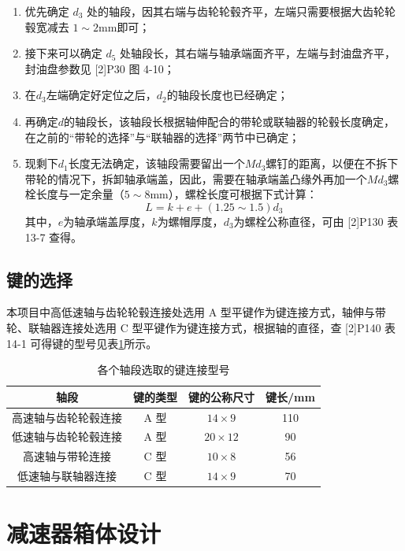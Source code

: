 \documentclass[12pt]{ctexart}
\begin{document}
\begin{enumerate}
    \item 优先确定 $d_3$ 处的轴段，因其右端与齿轮轮毂齐平，左端只需要根据大齿轮轮毂宽减去 $1\sim 2\text{mm}$即可；
    \item 接下来可以确定 $d_5$ 处轴段长，其右端与轴承端面齐平，左端与封油盘齐平，封油盘参数见 [2]P30 图 4-10；
    \item 在$d_3$左端确定好定位之后，$d_2$的轴段长度也已经确定；
    \item 再确定$d$的轴段长，该轴段长根据轴伸配合的带轮或联轴器的轮毂长度确定，在之前的“带轮的选择”与“联轴器的选择”两节中已确定；
    \item 现剩下$d_1$长度无法确定，该轴段需要留出一个$Md_3$螺钉的距离，以便在不拆下带轮的情况下，拆卸轴承端盖，因此，需要在轴承端盖凸缘外再加一个$Md_3$螺栓长度与一定余量（$5\sim 8$mm），螺栓长度可根据下式计算：
    $$L = k + e + (1.25\sim 1.5)d_3$$
    其中，$e$为轴承端盖厚度，$k$为螺帽厚度，$d_3$为螺栓公称直径，可由 [2]P130 表 13-7 查得。
\end{enumerate}

\subsection{键的选择}

本项目中高低速轴与齿轮轮毂连接处选用 A 型平键作为键连接方式，轴伸与带轮、联轴器连接处选用 C 型平键作为键连接方式，根据轴的直径，查 [2]P140 表 14-1 可得键的型号见表\ref{table16}所示。

\begin{table}[htbp]
    \centering
    \setlength{\belowcaptionskip}{0.3cm}
    \caption{各个轴段选取的键连接型号}
    \begin{tabular}{c c c c}
        \toprule
        轴段 & 键的类型 & 键的公称尺寸  & 键长/mm \\
        \midrule
        高速轴与齿轮轮毂连接   & A 型 & $14\times 9$    & 110\\
        低速轴与齿轮轮毂连接   & A 型 & $20\times 12$   & 90\\
        高速轴与带轮连接      & C 型  & $10\times 8$     & 56\\
        低速轴与联轴器连接    & C 型  &  $14 \times 9$    & 70\\
        \bottomrule
    \end{tabular}
    \label{table16}
\end{table}

\section{减速器箱体设计}
\end{document}

